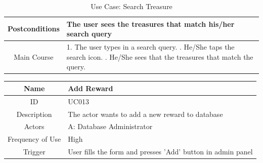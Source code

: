 \documentclass[12pt, a4paper, oneside]{article}
\begin{document}
\begin{table}[H]
\begin{tabularx}{\linewidth}{|c|X|}
Postconditions      & The user sees the treasures that match his/her search query                                                                                                                                      \\ \hline
Main Course         & 1. The user types in a search query. \newline 2. He/She taps the search icon. \newline 3. He/She sees that the treasures that match the query. \\ \hline
\end{tabularx}
\caption{Use Case: Search Treasure}
\label{uc-search-treasure}
\end{table}


\begin{table}[H]
\begin{tabularx}{\linewidth}{|c|X|}
\hline
Name                & Add Reward                                                                                                                                                                                                                      \\ \hline
ID                  & UC013                                                                                                                                                                                                                       \\ \hline
Description         & The actor wants to add a new reward to database                                                                                                                                                    \\ \hline
Actors              & A: Database Administrator                                                                                                                                                                                                 \\ \hline
Frequency of Use    & High                                                                                                                                                                                                                    \\ \hline
Trigger             & User fills the form and presses 'Add' button in admin panel                                                                                                                                                                                           \\ \hline

\end{tabularx}
\end{table}
\end{document}

